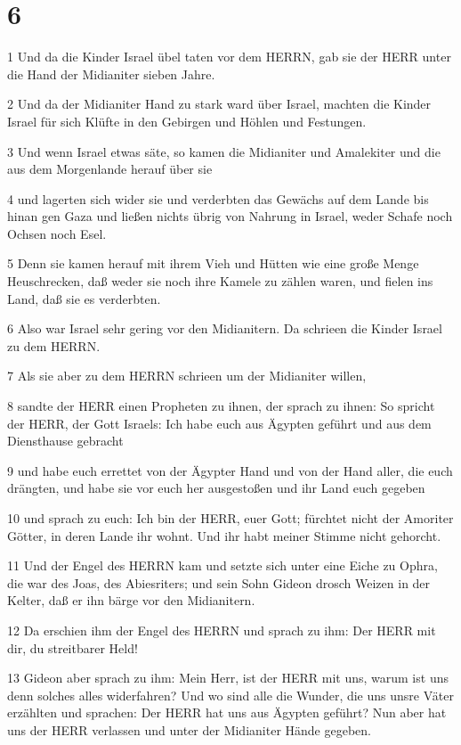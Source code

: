\chapter{6}

\par 1 Und da die Kinder Israel übel taten vor dem HERRN, gab sie der HERR unter die Hand der Midianiter sieben Jahre.
\par 2 Und da der Midianiter Hand zu stark ward über Israel, machten die Kinder Israel für sich Klüfte in den Gebirgen und Höhlen und Festungen.
\par 3 Und wenn Israel etwas säte, so kamen die Midianiter und Amalekiter und die aus dem Morgenlande herauf über sie
\par 4 und lagerten sich wider sie und verderbten das Gewächs auf dem Lande bis hinan gen Gaza und ließen nichts übrig von Nahrung in Israel, weder Schafe noch Ochsen noch Esel.
\par 5 Denn sie kamen herauf mit ihrem Vieh und Hütten wie eine große Menge Heuschrecken, daß weder sie noch ihre Kamele zu zählen waren, und fielen ins Land, daß sie es verderbten.
\par 6 Also war Israel sehr gering vor den Midianitern. Da schrieen die Kinder Israel zu dem HERRN.
\par 7 Als sie aber zu dem HERRN schrieen um der Midianiter willen,
\par 8 sandte der HERR einen Propheten zu ihnen, der sprach zu ihnen: So spricht der HERR, der Gott Israels: Ich habe euch aus Ägypten geführt und aus dem Diensthause gebracht
\par 9 und habe euch errettet von der Ägypter Hand und von der Hand aller, die euch drängten, und habe sie vor euch her ausgestoßen und ihr Land euch gegeben
\par 10 und sprach zu euch: Ich bin der HERR, euer Gott; fürchtet nicht der Amoriter Götter, in deren Lande ihr wohnt. Und ihr habt meiner Stimme nicht gehorcht.
\par 11 Und der Engel des HERRN kam und setzte sich unter eine Eiche zu Ophra, die war des Joas, des Abiesriters; und sein Sohn Gideon drosch Weizen in der Kelter, daß er ihn bärge vor den Midianitern.
\par 12 Da erschien ihm der Engel des HERRN und sprach zu ihm: Der HERR mit dir, du streitbarer Held!
\par 13 Gideon aber sprach zu ihm: Mein Herr, ist der HERR mit uns, warum ist uns denn solches alles widerfahren? Und wo sind alle die Wunder, die uns unsre Väter erzählten und sprachen: Der HERR hat uns aus Ägypten geführt? Nun aber hat uns der HERR verlassen und unter der Midianiter Hände gegeben.
